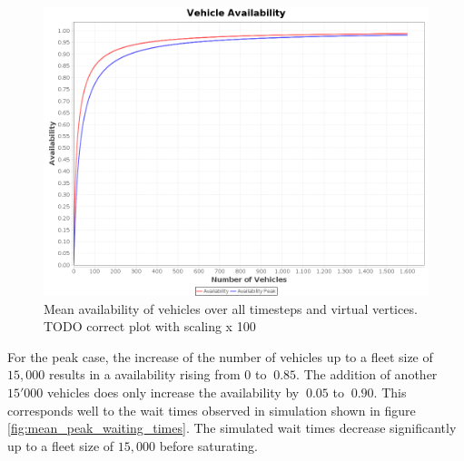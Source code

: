\begin{figure}[h]
\begin{center}\includegraphics[width=1.0\textwidth]{figures/availbilitiesByNumberVehicles.png}\end{center}
\caption{Mean availability of vehicles over all timesteps and virtual vertices.  TODO correct plot with scaling x 100}
\label{fig:performanceavailability}
\end{figure}

For the peak case, the increase of the number of vehicles up to a fleet size of $15,000$ results
in a availability rising from $0$ to $~0.85$. The addition of another $15'000$ vehicles does only increase the availability by $~0.05$ to $~0.90$. This corresponds well to the wait times observed in simulation shown in figure \ref{fig:mean_peak_waiting_times}. The simulated wait times decrease significantly up to a fleet size of $15,000$ before saturating. 